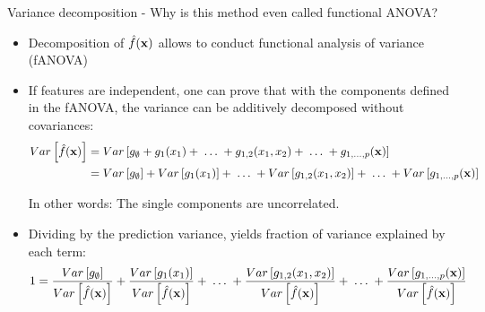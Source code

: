 \documentclass[11pt,compress,t,notes=noshow, aspectratio=169, xcolor=table]{beamer}
\newcommand{\open}{}
\newcommand{\close}{}
\begin{document}
\begin{frame}{Variance decomposition - Why is this method even called functional ANOVA?}

\begin{itemize}[<+->]
\item Decomposition of $\hat{f}(\mathbf{x})$ allows to conduct functional analysis of variance (fANOVA)
\item If features are independent, one can prove that with the components defined in the fANOVA, the variance can be additively decomposed without covariances:
 \begin{align*}Var\left[\hat{f}(\xv)\right] &=  Var\left[g_{\open \emptyset \close} + g_{\open 1 \close}(x_1) + \;\dots\; + g_{\open 1, 2 \close}(x_1, x_2) + \;\dots\; + g_{\open 1,\ldots,p \close}(\xv) \right] \\
&= Var\left[g_{\open \emptyset \close}\right] + Var\left[g_{\open 1 \close}(x_1)\right] + \;\dots\; + Var\left[g_{\open 1, 2 \close}(x_1, x_2)\right] + \;\dots\; + Var\left[g_{\open 1,\ldots,p \close}(\xv)\right]\end{align*}

In other words: The single components are uncorrelated.


\item Dividing by the prediction variance, yields fraction of variance explained by each term:
\begin{align*}
1 &= \frac{Var\left[g_{\open \emptyset \close}\right]}{\predvar} + \frac{Var\left[g_{\open 1 \close}(x_1)\right]}{\predvar} + %
\;\dots\;
+ \frac{Var\left[g_{\open 1, 2 \close}(x_1, x_2)\right]}{\predvar} + \;\dots\; + \frac{Var\left[g_{\open 1,\ldots,p \close}(\xv)\right]}{\predvar}
\end{align*}


\end{itemize}
\end{frame}
\end{document}
